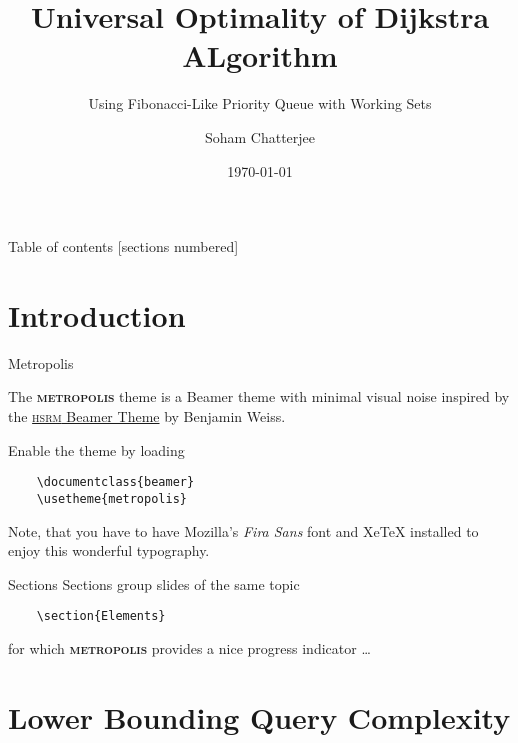 \documentclass[10pt]{beamer}
\title{Universal Optimality of Dijkstra ALgorithm}
\subtitle{Using Fibonacci-Like Priority Queue with Working Sets}
\date{\today}
\author{Soham Chatterjee}
\institute{Oral Qualifier, STCS}
\newcommand{\themename}{\textbf{\textsc{metropolis}}\xspace}
\begin{document}
\maketitle

\begin{frame}{Table of contents}
  [sections numbered]
  \tableofcontents[hideallsubsections]
\end{frame}

\section{Introduction}

\begin{frame}[fragile]{Metropolis}

  The \themename theme is a Beamer theme with minimal visual noise
  inspired by the \href{https://github.com/hsrmbeamertheme/hsrmbeamertheme}{\textsc{hsrm} Beamer
  Theme} by Benjamin Weiss.

  Enable the theme by loading

  \begin{verbatim}    \documentclass{beamer}
    \usetheme{metropolis}\end{verbatim}

  Note, that you have to have Mozilla's \emph{Fira Sans} font and XeTeX
  installed to enjoy this wonderful typography.
\end{frame}
\begin{frame}[fragile]{Sections}
  Sections group slides of the same topic

\begin{verbatim}    \section{Elements}\end{verbatim}

  for which \themename provides a nice progress indicator \ldots
\end{frame}

\section{Lower Bounding Query Complexity}
\end{document}
